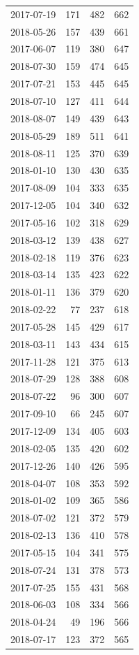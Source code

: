 \begin{tabular}{lrrr}
2017-07-19 & 171 & 482 & 662 \\
2018-05-26 & 157 & 439 & 661 \\
2017-06-07 & 119 & 380 & 647 \\
2018-07-30 & 159 & 474 & 645 \\
2017-07-21 & 153 & 445 & 645 \\
2018-07-10 & 127 & 411 & 644 \\
2018-08-07 & 149 & 439 & 643 \\
2018-05-29 & 189 & 511 & 641 \\
2018-08-11 & 125 & 370 & 639 \\
2018-01-10 & 130 & 430 & 635 \\
2017-08-09 & 104 & 333 & 635 \\
2017-12-05 & 104 & 340 & 632 \\
2017-05-16 & 102 & 318 & 629 \\
2018-03-12 & 139 & 438 & 627 \\
2018-02-18 & 119 & 376 & 623 \\
2018-03-14 & 135 & 423 & 622 \\
2018-01-11 & 136 & 379 & 620 \\
2018-02-22 & 77 & 237 & 618 \\
2017-05-28 & 145 & 429 & 617 \\
2018-03-11 & 143 & 434 & 615 \\
2017-11-28 & 121 & 375 & 613 \\
2018-07-29 & 128 & 388 & 608 \\
2018-07-22 & 96 & 300 & 607 \\
2017-09-10 & 66 & 245 & 607 \\
2017-12-09 & 134 & 405 & 603 \\
2018-02-05 & 135 & 420 & 602 \\
2017-12-26 & 140 & 426 & 595 \\
2018-04-07 & 108 & 353 & 592 \\
2018-01-02 & 109 & 365 & 586 \\
2018-07-02 & 121 & 372 & 579 \\
2018-02-13 & 136 & 410 & 578 \\
2017-05-15 & 104 & 341 & 575 \\
2018-07-24 & 131 & 378 & 573 \\
2017-07-25 & 155 & 431 & 568 \\
2018-06-03 & 108 & 334 & 566 \\
2018-04-24 & 49 & 196 & 566 \\
2018-07-17 & 123 & 372 & 565 \\

\end{tabular}
